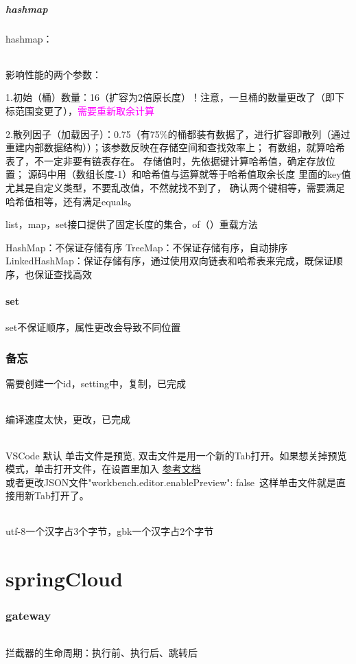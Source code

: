 \documentclass[12pt]{ctexart}
\begin{document}
\subsubsection{hashmap}
hashmap：
\paragraph{}
影响性能的两个参数：\subparagraph{}
1.初始（桶）数量：16（扩容为2倍原长度）！注意，一旦桶的数量更改了（即下标范围变更了），\textcolor{magenta}{需要重新取余计算} \subparagraph{}
2.散列因子（加载因子）：0.75（有75\%的桶都装有数据了，进行扩容即散列（通过重建内部数据结构））；该参数反映在存储空间和查找效率上；
有数组，就算哈希表了，不一定非要有链表存在。
存储值时，先依据键计算哈希值，确定存放位置；
源码中用（数组长度-1）和哈希值与运算就等于哈希值取余长度
里面的key值尤其是自定义类型，不要乱改值，不然就找不到了，
确认两个键相等，需要满足哈希值相等，还有满足equals。


list，map，set接口提供了固定长度的集合，of（）重载方法

HashMap：不保证存储有序
TreeMap：不保证存储有序，自动排序
LinkedHashMap：保证存储有序，通过使用双向链表和哈希表来完成，既保证顺序，也保证查找高效

\subsection{set}
set不保证顺序，属性更改会导致不同位置

\section{备忘}
需要创建一个id，setting中，复制，已完成\paragraph{}
编译速度太快，更改，已完成\paragraph{}
VSCode 默认 单击文件是预览, 双击文件是用一个新的Tab打开。如果想关掉预览模式，单击打开文件，在设置里加入
\href{https://blog.csdn.net/qq_41865652/article/details/107024390}{参考文档}\\
或者更改JSON文件"workbench.editor.enablePreview": false\ 这样单击文件就是直接用新Tab打开了。
\paragraph{}
utf-8一个汉字占3个字节，gbk一个汉字占2个字节
\part{springCloud}
\section{gateway}
\paragraph{}
\quad 拦截器的生命周期：执行前、执行后、跳转后
\end{document}
